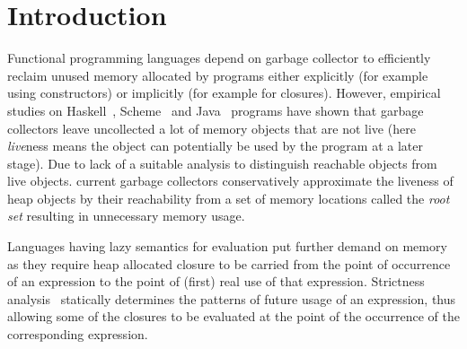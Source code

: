 \documentclass[10pt]{sigplanconf}
\begin{document}
\section{Introduction}
\label{sec:intro}

Functional  programming  languages  depend  on  garbage  collector  to
efficiently  reclaim  unused  memory   allocated  by  programs  either
explicitly (for example using constructors) or implicitly (for example
for      closures).       However,      empirical      studies      on
Haskell~\cite{rojemo96lag},  Scheme~\cite{karkare06effectiveness}  and
Java~\cite{shaham02estimating}  programs   have  shown   that  garbage
collectors leave uncollected a lot of memory objects that are not live
(here {\em live}ness  means the object can potentially be  used by the
program at  a later  stage).  Due  to lack of  a suitable  analysis to
distinguish  reachable  objects  from live  objects.  current  garbage
collectors conservatively approximate the  liveness of heap objects by
their reachability from a set of memory locations called the {\em root
  set\/} resulting in unnecessary memory usage.

Languages having lazy  semantics for evaluation put  further demand on
memory as they  require heap allocated closure to be  carried from the
point of occurrence  of an expression to the point  of (first) real use
of  that expression.  Strictness analysis~\cite{some-refs}  statically
determines  the  patterns  of  future usage  of  an  expression,  thus
allowing some  of the  closures to  be evaluated at  the point  of the
occurrence of the corresponding expression.
\newcommand{\nilfigure}
{\scalebox{0.75}{
\psset{unit=1mm,nodesep=0mm,labelsep=0.5mm}
\begin{pspicture}(0,0)(1,1)
\putnode{start}{origin}{0}{0}{}
\putnode{stop}{origin}{10}{10}{}
\ncline[offsetB=0,nodesepB=0,linewidth=.7]{-}{start}{stop} %
\end{pspicture}
}}
\end{document}

